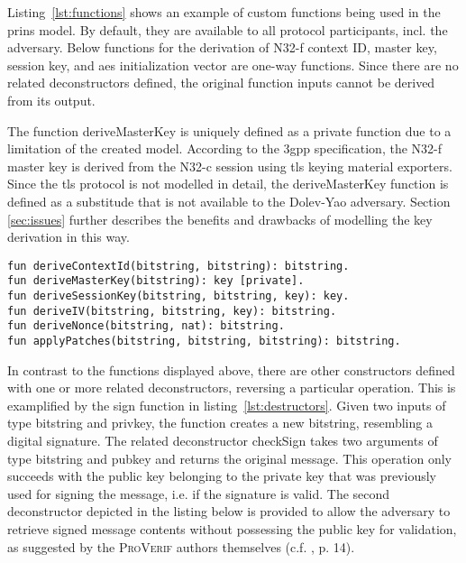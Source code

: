 Listing~\ref{lst:functions} shows an example of custom functions being used in the \gls{prins} model.
By default, they are available to all protocol participants, incl. the adversary.
Below functions for the derivation of N32-f context ID, master key, session key, and \gls{aes} initialization vector are one-way functions.
Since there are no related deconstructors defined, the original function inputs cannot be derived from its output.

The function {\sffamily deriveMasterKey} is uniquely defined as a private function due to a limitation of the created model.
According to the \gls{3gpp} specification, the N32-f master key is derived from the N32-c session using \gls{tls} keying material exporters.
Since the \gls{tls} protocol is not modelled in detail, the {\sffamily deriveMasterKey} function is defined as a substitude that is not available to the Dolev-Yao adversary.
Section \ref{sec:issues} further describes the benefits and drawbacks of modelling the key derivation in this way.

\begin{lstlisting}[caption={Definition of custom one-way functions},label={lst:functions},firstnumber=96]
fun deriveContextId(bitstring, bitstring): bitstring.
fun deriveMasterKey(bitstring): key [private].
fun deriveSessionKey(bitstring, bitstring, key): key.
fun deriveIV(bitstring, bitstring, key): bitstring.
fun deriveNonce(bitstring, nat): bitstring.
fun applyPatches(bitstring, bitstring, bitstring): bitstring.
\end{lstlisting}

In contrast to the functions displayed above, there are other constructors defined with one or more related deconstructors, reversing a particular operation.
This is examplified by the {\sffamily sign} function in listing~\ref{lst:destructors}.
Given two inputs of type {\sffamily bitstring} and {\sffamily privkey}, the function creates a new {\sffamily bitstring}, resembling a digital signature.
The related deconstructor {\sffamily checkSign} takes two arguments of type {\sffamily bitstring} and {\sffamily pubkey} and returns the original message.
This operation only succeeds with the public key belonging to the private key that was previously used for signing the message, i.e. if the signature is valid.
The second deconstructor depicted in the listing below is provided to allow the adversary to retrieve signed message contents without possessing the public key for validation, as suggested by the \textsc{ProVerif} authors themselves (c.f. \cite{blanchet2020proverif}, p. 14).

